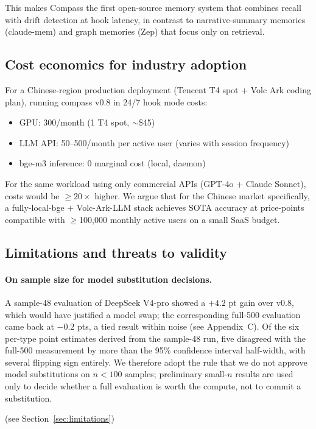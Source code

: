 This makes Compass the first open-source memory system that combines
recall with drift detection at hook latency, in contrast to
narrative-summary memories (claude-mem) and graph memories (Zep)
that focus only on retrieval.

\subsection{Cost economics for industry adoption}

For a Chinese-region production deployment (Tencent T4 spot + Volc Ark
coding plan), running compass v0.8 in 24/7 hook mode costs:

\begin{itemize}
\item GPU: \cny{}300/month (1 T4 spot, \(\sim\)\$45)
\item LLM API: \cny{}50--500/month per active user (varies with
  session frequency)
\item bge-m3 inference: 0 marginal cost (local, daemon)
\end{itemize}

For the same workload using only commercial APIs (GPT-4o + Claude
Sonnet), costs would be \(\geq\)\(20\times\) higher. We argue that for
the Chinese market specifically, a fully-local-bge + Volc-Ark-LLM
stack achieves SOTA accuracy at price-points compatible with
\(\geq\)100,000 monthly active users on a small SaaS budget.

\subsection{Limitations and threats to validity}

\paragraph{On sample size for model substitution decisions.}
A sample-48 evaluation of DeepSeek V4-pro showed a \(+4.2\) pt gain
over v0.8, which would have justified a model swap; the corresponding
full-500 evaluation came back at \(-0.2\) pts, a tied result within
noise (see Appendix~C). Of the six per-type point estimates derived
from the sample-48 run, five disagreed with the full-500 measurement
by more than the 95\% confidence interval half-width, with several
flipping sign entirely. We therefore adopt the rule that we do not
approve model substitutions on \(n<100\) samples; preliminary
small-\(n\) results are used only to decide whether a full evaluation
is worth the compute, not to commit a substitution.

(see Section~\ref{sec:limitations})
